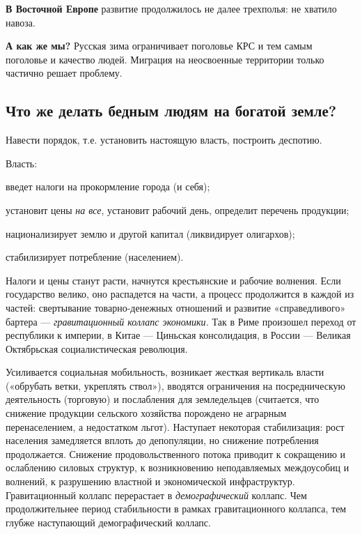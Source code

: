 \documentclass[twoside,a4paper]{article}
\begin{document}
{
\textbf{В Восточной Европе} развитие продолжилось не далее трехполья: не хватило навоза. }

{
\textbf{А как же мы?} Русская зима ограничивает поголовье КРС и тем самым поголовье и качество людей. Миграция на
неосвоенные территории только частично решает проблему.}

\subsection[Что же делать бедным людям на богатой земле?]{\rmfamily Что же делать бедным людям на богатой земле?}
{
Навести порядок, т.е. установить настоящую власть, построить деспотию. }

{
Власть:}

{
введет налоги на прокормление города (и себя);}

{
установит цены \textit{на все}, установит рабочий день, определит перечень продукции;}

{
национализирует землю и другой капитал (ликвидирует олигархов);}

{
стабилизирует потребление (населением).}

{
Налоги и цены станут расти, начнутся крестьянские и рабочие волнения. Если государство велико, оно распадется на части,
а процесс продолжится в каждой из частей: свертывание товарно-денежных отношений и развитие «справедливого» бартера —
\textit{гравитационный коллапс экономики.} Так в Риме произошел переход от республики к империи, в Китае — Циньская
консолидация, в России — Великая Октябрьская социалистическая революция. }

{
Усиливается социальная мобильность, возникает жесткая вертикаль власти («обрубать ветки, укреплять ствол»), вводятся
ограничения на посредническую деятельность (торговую) и послабления для земледельцев (считается, что снижение продукции
сельского хозяйства порождено не аграрным перенаселением, а недостатком льгот). Наступает некоторая стабилизация: рост
населения замедляется вплоть до депопуляции, но снижение потребления продолжается. Снижение продовольственного потока
приводит к сокращению и ослаблению силовых структур, к возникновению неподавляемых междоусобиц и волнений, к разрушению
властной и экономической инфраструктур. Гравитационный коллапс перерастает в \textit{демографический }коллапс. Чем
продолжительнее период стабильности в рамках гравитационного коллапса, тем глубже наступающий демографический коллапс.
}
\end{document}
